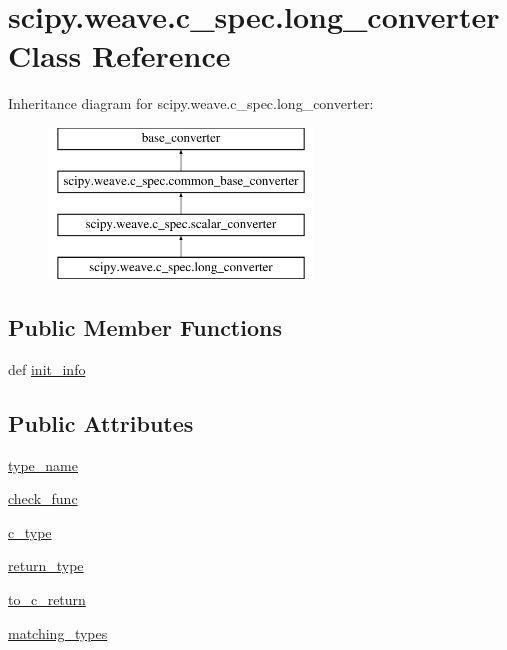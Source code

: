 \hypertarget{classscipy_1_1weave_1_1c__spec_1_1long__converter}{}\section{scipy.\+weave.\+c\+\_\+spec.\+long\+\_\+converter Class Reference}
\label{classscipy_1_1weave_1_1c__spec_1_1long__converter}
Inheritance diagram for scipy.\+weave.\+c\+\_\+spec.\+long\+\_\+converter\+:\begin{figure}[H]
\begin{center}
\leavevmode
\includegraphics[height=4.000000cm]{classscipy_1_1weave_1_1c__spec_1_1long__converter}
\end{center}
\end{figure}
\subsection*{Public Member Functions}
\begin{DoxyCompactItemize}
\item 
def \hyperlink{classscipy_1_1weave_1_1c__spec_1_1long__converter_ada99442cfe63d914880438baba5f3195}{init\+\_\+info}
\end{DoxyCompactItemize}
\subsection*{Public Attributes}
\begin{DoxyCompactItemize}
\item 
\hyperlink{classscipy_1_1weave_1_1c__spec_1_1long__converter_aa44677e7886cfee9fe1f8e51b5dc1538}{type\+\_\+name}
\item 
\hyperlink{classscipy_1_1weave_1_1c__spec_1_1long__converter_aa0016931a35bef21968230341ab0b916}{check\+\_\+func}
\item 
\hyperlink{classscipy_1_1weave_1_1c__spec_1_1long__converter_a752462d7cdaff49f235ed094180b0e81}{c\+\_\+type}
\item 
\hyperlink{classscipy_1_1weave_1_1c__spec_1_1long__converter_a870346b1a99fd095ae4d47c5db5add1d}{return\+\_\+type}
\item 
\hyperlink{classscipy_1_1weave_1_1c__spec_1_1long__converter_af60a9621fd9e2249a3254bc1dfe67d5d}{to\+\_\+c\+\_\+return}
\item 
\hyperlink{classscipy_1_1weave_1_1c__spec_1_1long__converter_aa01ecc95b3097aabb51a31584d11e843}{matching\+\_\+types}
\end{DoxyCompactItemize}


